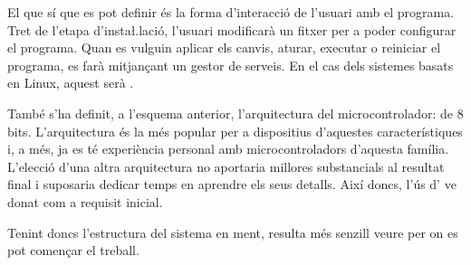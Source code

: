 El que sí que es pot definir és la forma d'interacció de l'usuari amb el
programa. Tret de l'etapa d'insta\l.lació, l'usuari modificarà un fitxer per a
poder configurar el programa. Quan es vulguin aplicar els canvis, aturar,
executar o reiniciar el programa, es farà mitjançant un gestor de serveis. En el
cas dels sistemes basats en Linux, aquest serà .

També s'ha definit, a l'esquema anterior, l'arquitectura del microcontrolador:
 de 8 bits. L'arquitectura  és la més popular per a
dispositius d'aquestes característiques i, a més, ja es té experiència personal
amb microcontroladors d'aquesta família. L'elecció d'una altra arquitectura
no aportaria millores substancials al resultat final i suposaria dedicar temps
en aprendre els seus detalls. Així doncs, l'ús d' ve donat com
a requisit inicial.

Tenint doncs l'estructura del sistema en ment, resulta més senzill veure per on
es pot començar el treball.
